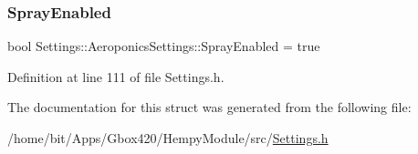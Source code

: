 \mbox{\label{struct_settings_1_1_aeroponics_settings_a278a7d656d1c9897ce93826285eea2a2}} 
\subsubsection{\texorpdfstring{Spray\+Enabled}{SprayEnabled}}
{\footnotesize\ttfamily bool Settings\+::\+Aeroponics\+Settings\+::\+Spray\+Enabled = true}



Definition at line 111 of file Settings.\+h.



The documentation for this struct was generated from the following file\+:\begin{DoxyCompactItemize}
\item 
/home/bit/\+Apps/\+Gbox420/\+Hempy\+Module/src/\hyperlink{_hempy_module_2src_2_settings_8h}{Settings.\+h}\end{DoxyCompactItemize}
